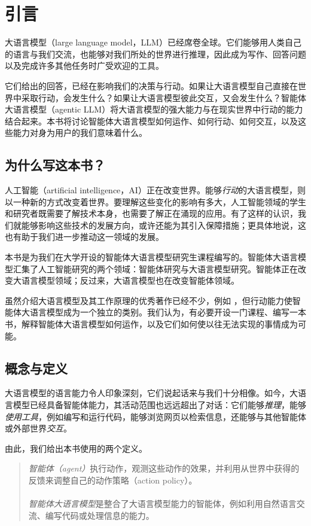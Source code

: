 \chapter{引言}\label{chap:intro}
大语言模型（large language model，LLM）已经席卷全球。它们能够用人类自己的语言与我们交流，也能够对我们所处的世界进行推理，因此成为写作、回答问题以及完成许多其他任务时广受欢迎的工具。

它们给出的回答，已经在影响我们的决策与行动。如果让大语言模型自己直接在世界中采取行动，会发生什么？如果让大语言模型彼此交互，又会发生什么？智能体大语言模型（agentic LLM）将大语言模型的强大能力与在现实世界中行动的能力结合起来。本书将讨论智能体大语言模型如何运作、如何行动、如何交互，以及这些能力对身为用户的我们意味着什么。

\section{为什么写这本书？}
人工智能（artificial intelligence，AI）正在改变世界。能够{\em 行动}的大语言模型，则以一种新的方式改变着世界。要理解这些变化的影响有多大，人工智能领域的学生和研究者既需要了解技术本身，也需要了解正在涌现的应用。有了这样的认识，我们就能够影响这些技术的发展方向，或许还能为其引入保障措施；更具体地说，这也有助于我们进一步推动这一领域的发展。

本书是为我们在大学开设的智能体大语言模型研究生课程编写的。智能体大语言模型汇集了人工智能研究的两个领域：智能体研究与大语言模型研究。智能体正在改变大语言模型领域；反过来，大语言模型也在改变智能体领域。

虽然介绍大语言模型及其工作原理的优秀著作已经不少，例如 \citet{jm3}，但行动能力使智能体大语言模型成为一个独立的类别。我们认为，有必要开设一门课程、编写一本书，解释智能体大语言模型如何运作，以及它们如何使以往无法实现的事情成为可能。

\section{概念与定义}
大语言模型的语言能力令人印象深刻，它们说起话来与我们十分相像。如今，大语言模型已经具备智能体能力，其活动范围也远远超出了对话：它们能够{\em 推理}，能够{\em 使用工具}，例如编写和运行代码，能够浏览网页以检索信息，还能够与其他智能体或外部世界{\em 交互}。

由此，我们给出本书使用的两个定义。
\begin{quotation}
\noindent
{\em 智能体（agent）}执行动作，观测这些动作的效果，并利用从世界中获得的反馈来调整自己的动作策略（action policy）。\\
\\
{\em 智能体大语言模型}是整合了大语言模型能力的智能体，例如利用自然语言交流、编写代码或处理信息的能力。
\end{quotation}

